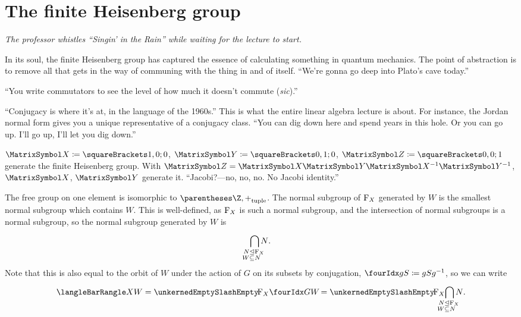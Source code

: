 \documentclass[10pt, a4paper, twoside]{lecturenotes}
\begin{document}
\section{The finite Heisenberg group}
\begin{lecture}[date=2013-03-14, official=true]
\emph{The professor whistles ``Singin' in the Rain'' while waiting for the lecture to start.}

In its soul, the finite Heisenberg group has captured the essence of calculating something in quantum mechanics. The point of abstraction is to remove all that gets in the way of communing with the thing in and of itself. 
``We're gonna go deep into Plato's cave today.''

``You write commutators to see the level of how much it doesn't commute (\emph{sic}).''

 ``Conjugacy is where it's at, in the language of the 1960s.'' This is what the entire linear algebra lecture is about. For instance, the Jordan normal form gives you a unique representative of a conjugacy class. ``You can dig down here and spend years in this hole. Or you can go up. I'll go up, I'll let you dig down.''

$\matX\DefineAs\Helt 1 0 0$, $\matY\DefineAs\Helt 0 1 0$, $\matZ\DefineAs\Helt 0 0 1$ generate the finite Heisenberg group. With $\matZ=\matX\matY\matX^{-1}\matY^{-1}$, $\matX$, $\matY$ generate it. ``Jacobi?---no, no, no. No Jacobi identity.'' 

The free group on one element is isomorphic to $\tuple{\Z,+}$. The normal subgroup of $\operatorname{F}_{X}$ generated by $W$ is the smallest normal subgroup which contains $W$. This is well-defined, as $\operatorname{F}_{X}$ is such a normal subgroup, and the intersection of normal subgroups is a normal subgroup, so the normal subgroup generated by $W$ is
\begin{equation*}
  \IntersectionOver {
    \LongDomainSpec{
      \mathllap{N\NormalSubgroup} \mathrlap{\FreeGroup X}\\
      \mathllap{W\Subset} \mathrlap{N}
    }
  } N\text{.}
\end{equation*}
Note that this is also equal to the orbit of $W$ under the action of $G$ on its subsets by conjugation, $\LeftConjugationAction g S \DefineAs g S g^{-1}$, so we can write
\begin{equation*}
\GroupPresentation{X}{W} = \QuotientGroup{\FreeGroup X}{\LeftConjugationAction G W} = \QuotientGroup{\FreeGroup X}{
  \IntersectionOver {
    \LongDomainSpec{
      \mathllap{N\NormalSubgroup} \mathrlap{\FreeGroup X}\\
      \mathllap{W\Subset} \mathrlap{N}
    }
  } N\text{.}
}
\end{equation*}


\end{lecture}
\end{document}
